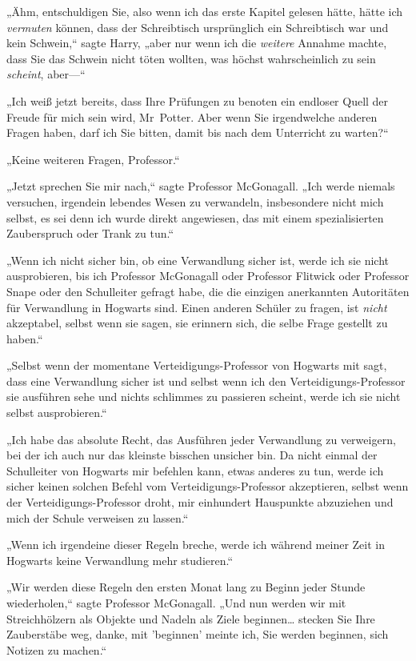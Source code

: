 {„Ähm, entschuldigen Sie, also wenn ich das erste Kapitel gelesen hätte, hätte ich \emph{vermuten} können, dass der Schreibtisch ursprünglich ein Schreibtisch war und kein Schwein,“ sagte Harry, „aber nur wenn ich die \emph{weitere} Annahme machte, dass Sie das Schwein nicht töten wollten, was höchst wahrscheinlich zu sein \emph{scheint}, aber—“

„Ich weiß jetzt bereits, dass Ihre Prüfungen zu benoten ein endloser Quell der Freude für mich sein wird, Mr~Potter. Aber wenn Sie irgendwelche anderen Fragen haben, darf ich Sie bitten, damit bis nach dem Unterricht zu warten?“

„Keine weiteren Fragen, Professor.“

„Jetzt sprechen Sie mir nach,“ sagte Professor McGonagall. „Ich werde niemals versuchen, irgendein lebendes Wesen zu verwandeln, insbesondere nicht mich selbst, es sei denn ich wurde direkt angewiesen, das mit einem spezialisierten Zauberspruch oder Trank zu tun.“

„Wenn ich nicht sicher bin, ob eine Verwandlung sicher ist, werde ich sie nicht ausprobieren, bis ich Professor McGonagall oder Professor Flitwick oder Professor Snape oder den Schulleiter gefragt habe, die die einzigen anerkannten Autoritäten für Verwandlung in Hogwarts sind. Einen anderen Schüler zu fragen, ist \emph{nicht} akzeptabel, selbst wenn sie sagen, sie erinnern sich, die selbe Frage gestellt zu haben.“

„Selbst wenn der momentane Verteidigungs-Professor von Hogwarts mit sagt, dass eine Verwandlung sicher ist und selbst wenn ich den Verteidigungs-Professor sie ausführen sehe und nichts schlimmes zu passieren scheint, werde ich sie nicht selbst ausprobieren.“

„Ich habe das absolute Recht, das Ausführen jeder Verwandlung zu verweigern, bei der ich auch nur das kleinste bisschen unsicher bin. Da nicht einmal der Schulleiter von Hogwarts mir befehlen kann, etwas anderes zu tun, werde ich sicher keinen solchen Befehl vom Verteidigungs-Professor akzeptieren, selbst wenn der Verteidigungs-Professor droht, mir einhundert Hauspunkte abzuziehen und mich der Schule verweisen zu lassen.“

„Wenn ich irgendeine dieser Regeln breche, werde ich während meiner Zeit in Hogwarts keine Verwandlung mehr studieren.“

„Wir werden diese Regeln den ersten Monat lang zu Beginn jeder Stunde wiederholen,“ sagte Professor McGonagall. „Und nun werden wir mit Streichhölzern als Objekte und Nadeln als Ziele beginnen… stecken Sie Ihre Zauberstäbe weg, danke, mit 'beginnen' meinte ich, Sie werden beginnen, sich Notizen zu machen.“

}
